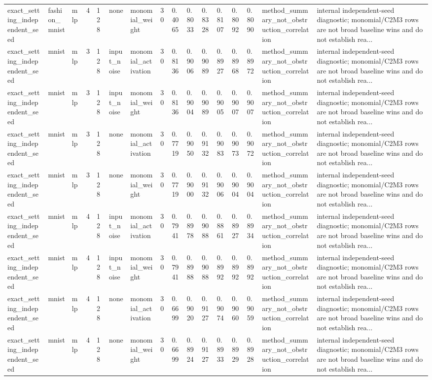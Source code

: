 \begin{tabular}{llllllllllllllll}
exact\_setting\_independent\_seed & fashion\_mnist & mlp & 4 & 128 & none & monomial\_weight & 30 & 0.4065 & 0.8033 & 0.8328 & 0.8107 & 0.8092 & 0.8090 & method\_summary\_not\_obstruction\_correlation & internal independent-seed diagnostic; monomial/C2M3 rows are not broad baseline wins and do not establish rea... \\
exact\_setting\_independent\_seed & mnist & mlp & 3 & 128 & input\_noise & monomial\_activation & 30 & 0.8136 & 0.9006 & 0.9089 & 0.8927 & 0.8968 & 0.8972 & method\_summary\_not\_obstruction\_correlation & internal independent-seed diagnostic; monomial/C2M3 rows are not broad baseline wins and do not establish rea... \\
exact\_setting\_independent\_seed & mnist & mlp & 3 & 128 & input\_noise & monomial\_weight & 30 & 0.8136 & 0.9004 & 0.9089 & 0.9005 & 0.9007 & 0.9007 & method\_summary\_not\_obstruction\_correlation & internal independent-seed diagnostic; monomial/C2M3 rows are not broad baseline wins and do not establish rea... \\
exact\_setting\_independent\_seed & mnist & mlp & 3 & 128 & none & monomial\_activation & 30 & 0.7719 & 0.9050 & 0.9132 & 0.9083 & 0.9073 & 0.9072 & method\_summary\_not\_obstruction\_correlation & internal independent-seed diagnostic; monomial/C2M3 rows are not broad baseline wins and do not establish rea... \\
exact\_setting\_independent\_seed & mnist & mlp & 3 & 128 & none & monomial\_weight & 30 & 0.7719 & 0.9000 & 0.9132 & 0.9006 & 0.9004 & 0.9004 & method\_summary\_not\_obstruction\_correlation & internal independent-seed diagnostic; monomial/C2M3 rows are not broad baseline wins and do not establish rea... \\
exact\_setting\_independent\_seed & mnist & mlp & 4 & 128 & input\_noise & monomial\_activation & 30 & 0.7941 & 0.8978 & 0.9088 & 0.8861 & 0.8927 & 0.8934 & method\_summary\_not\_obstruction\_correlation & internal independent-seed diagnostic; monomial/C2M3 rows are not broad baseline wins and do not establish rea... \\
exact\_setting\_independent\_seed & mnist & mlp & 4 & 128 & input\_noise & monomial\_weight & 30 & 0.7941 & 0.8988 & 0.9088 & 0.8992 & 0.8992 & 0.8992 & method\_summary\_not\_obstruction\_correlation & internal independent-seed diagnostic; monomial/C2M3 rows are not broad baseline wins and do not establish rea... \\
exact\_setting\_independent\_seed & mnist & mlp & 4 & 128 & none & monomial\_activation & 30 & 0.6699 & 0.9020 & 0.9127 & 0.9074 & 0.9060 & 0.9059 & method\_summary\_not\_obstruction\_correlation & internal independent-seed diagnostic; monomial/C2M3 rows are not broad baseline wins and do not establish rea... \\
exact\_setting\_independent\_seed & mnist & mlp & 4 & 128 & none & monomial\_weight & 30 & 0.6699 & 0.8924 & 0.9127 & 0.8933 & 0.8929 & 0.8928 & method\_summary\_not\_obstruction\_correlation & internal independent-seed diagnostic; monomial/C2M3 rows are not broad baseline wins and do not establish rea... \\
\bottomrule
\end{tabular}

